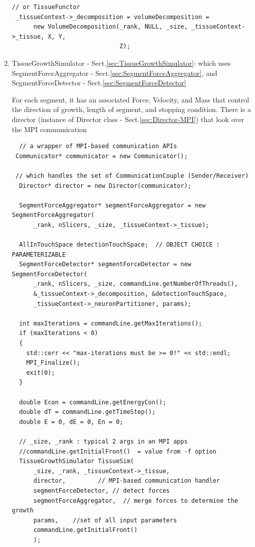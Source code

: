 \begin{enumerate}
\begin{verbatim}
// or TissueFunctor
 _tissueContext->_decomposition = volumeDecomposition =
      new VolumeDecomposition(_rank, NULL, _size, _tissueContext->_tissue, X, Y,
                              Z);
\end{verbatim} 

  \item TissueGrowthSimulator -
  Sect.\ref{sec:TissueGrowthSimulator}:
  which uses SegmentForceAggregator - Sect.\ref{sec:SegmentForceAggregator}, 
  and SegmentForceDetector - Sect.\ref{sec:SegmentForceDetector}
  
  For each segment, it has an associated Force, Velocity, and Mass that control
  the direction of growth, length of segment, and stopping condition.
  There is a director (instance of Director class -
  Sect.\ref{sec:Director-MPI}) that look over the MPI communication
  
\begin{verbatim}
  // a wrapper of MPI-based communication APIs
 Communicator* communicator = new Communicator();
 
 // which handles the set of CommunicationCouple (Sender/Receiver)
  Director* director = new Director(communicator);

  SegmentForceAggregator* segmentForceAggregator = new SegmentForceAggregator(
      _rank, nSlicers, _size, _tissueContext->_tissue);

  AllInTouchSpace detectionTouchSpace;  // OBJECT CHOICE : PARAMETERIZABLE
  SegmentForceDetector* segmentForceDetector = new SegmentForceDetector(
      _rank, nSlicers, _size, commandLine.getNumberOfThreads(),
      &_tissueContext->_decomposition, &detectionTouchSpace,
      _tissueContext->_neuronPartitioner, params);

  int maxIterations = commandLine.getMaxIterations();
  if (maxIterations < 0)
  {
    std::cerr << "max-iterations must be >= 0!" << std::endl;
    MPI_Finalize();
    exit(0);
  }

  double Econ = commandLine.getEnergyCon();
  double dT = commandLine.getTimeStep();
  double E = 0, dE = 0, En = 0;

  // _size, _rank : typical 2 args in an MPI apps
  //commandLine.getInitialFront()  = value from -f option
  TissueGrowthSimulator TissueSim(
      _size, _rank, _tissueContext->_tissue, 
      director,         // MPI-based communication handler 
      segmentForceDetector, // detect forces 
      segmentForceAggregator,  // merge forces to determine the growth
      params,    //set of all input parameters 
      commandLine.getInitialFront()
      );


\end{verbatim}
\end{enumerate}
